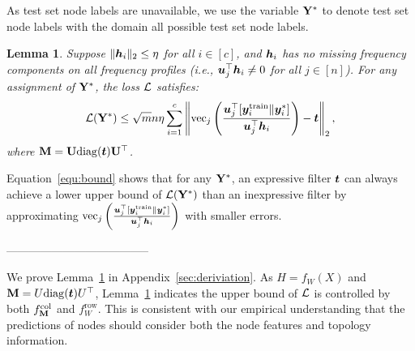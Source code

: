 \documentclass{article} %
\newtheorem{lemma}{\textbf{Lemma}}
\begin{document}
	As test set node labels are unavailable, we use the variable ${\mathbf{Y}}^*$ to denote test set node labels with the domain all possible test set node labels.
	\begin{lemma}
		\label{prop:loss_bound}
		Suppose $\|{\bm{h}}_i\|_2\leq\eta$ for all $i\in[c]$, and ${\bm{h}}_i$ has no missing frequency components on all frequency profiles (i.e., ${\bm{u}}_j^{\top}{\bm{h}}_i\neq 0$ for all $j\in[n]$). For any assignment of ${\mathbf{Y}}^*$, the loss ${\mathcal{L}}$ satisfies:
		\begin{equation}
			\label{equ:bound}
			\begin{aligned}
				{\mathcal{L}}({\mathbf{Y}}^*)\leq\sqrt{m}n\eta\sum_{i=1}^c\left\|\mathrm{vec}_j\left(\frac{{\bm{u}}_j^{\top}[{\bm{y}}^{\textrm{train}}_i\|{\bm{y}}^*_i]}{{\bm{u}}_j^{\top}{\bm{h}}_i}\right)-{\bm{t}}\right\|_2,
			\end{aligned}
		\end{equation}
		where ${\mathbf{M}}={\mathbf{U}}\mathrm{diag}({\bm{t}}){\mathbf{U}}^{\top}$.
	\end{lemma}
	
	Equation~\ref{equ:bound} shows that for any ${\mathbf{Y}}^*$, an expressive filter ${\bm{t}}$ can always achieve a lower upper bound of ${\mathcal{L}}({\mathbf{Y}}^*)$ than an inexpressive filter by approximating $\mathrm{vec}_j\left(\frac{{\bm{u}}_j^{\top}[{\bm{y}}^{\textrm{train}}_i\|{\bm{y}}^*_i]}{{\bm{u}}_j^{\top}{\bm{h}}_i}\right)$ with smaller errors.
	
	
	--------------------------------------
	
	We prove Lemma~\ref{prop:loss_bound} in Appendix~\ref{sec:deriviation}.
	As $H=f_W(X)$ and ${\mathbf{M}}=U\mathrm{diag}({\bm{t}})U^{\top}$, Lemma~\ref{prop:loss_bound} indicates the upper bound of ${\mathcal{L}}$ is controlled by both $f_{{\mathbf{M}}}^{\mathrm{col}}$ and $f_W^{\mathrm{row}}$.
	This is consistent with our empirical understanding that the predictions of nodes should consider both the node features and topology information.
	
\end{document}
